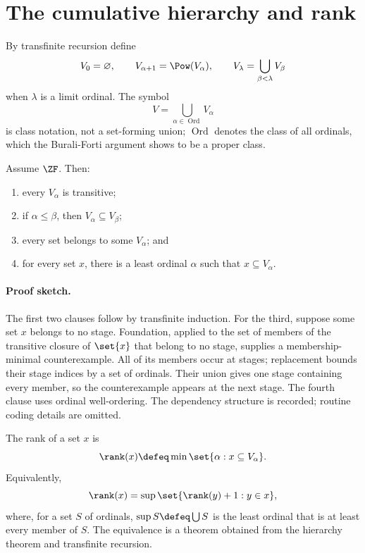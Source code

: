 \section{The cumulative hierarchy and rank}
\label{sec:cumulative-hierarchy-02}

\begin{definition}
By transfinite recursion define
\[
  V_0=\varnothing,\qquad
  V_{\alpha+1}=\Pow(V_\alpha),\qquad
  V_\lambda=\bigcup_{\beta<\lambda}V_\beta
\]
when \(\lambda\) is a limit ordinal.  The symbol
\[
  V=\bigcup_{\alpha\in\operatorname{Ord}}V_\alpha
\]
is class notation, not a set-forming union; \(\operatorname{Ord}\)
denotes the class of all ordinals, which the Burali-Forti argument shows to
be a proper class.
\end{definition}

\begin{theorem}
Assume \(\ZF\).  Then:
\begin{enumerate}
  \item every \(V_\alpha\) is transitive;
  \item if \(\alpha\leq\beta\), then \(V_\alpha\subseteq V_\beta\);
  \item every set belongs to some \(V_\alpha\); and
  \item for every set \(x\), there is a least ordinal \(\alpha\) such that
        \(x\subseteq V_\alpha\).
\end{enumerate}
\end{theorem}

\paragraph{Proof sketch.}
The first two clauses follow by transfinite induction.  For the third,
suppose some set \(x\) belongs to no stage.  Foundation, applied to the
set of members of the transitive closure of \(\set{x}\) that belong to no
stage, supplies a membership-minimal counterexample.
All of its members occur at stages; replacement bounds their stage indices by
a set of ordinals.  Their union gives one stage containing every member, so the
counterexample appears at the next stage.  The fourth clause uses ordinal
well-ordering.  The dependency structure is recorded; routine coding details
are omitted.

\begin{definition}[Rank]
The rank of a set \(x\) is
\[
  \rank(x)\defeq
  \min\set{\alpha:x\subseteq V_\alpha}.
\]
Equivalently,
\[
  \rank(x)=\sup\set{\rank(y)+1:y\in x},
\]
where, for a set \(S\) of ordinals, \(\sup S\defeq\bigcup S\) is the
least ordinal that is at least every member of \(S\).
The equivalence is a theorem obtained from the hierarchy theorem and
transfinite recursion.
\end{definition}

